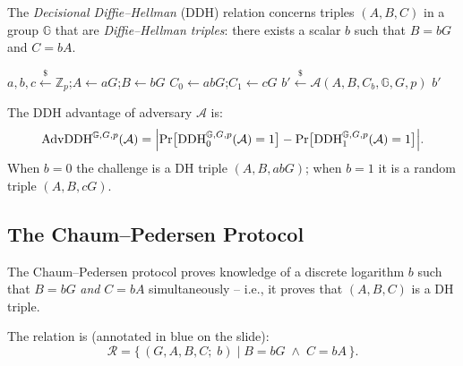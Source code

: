 \documentclass[11pt]{article}
\theoremstyle{plain}
\theoremstyle{definition}
\newcommand{\Zp}{\mathbb{Z}_p}
\newcommand{\getsr}{\xleftarrow{\$}}
\begin{document}
The \emph{Decisional Diffie--Hellman} (DDH) relation concerns triples $(A, B, C)$ in a group $\mathbb{G}$ that are \emph{Diffie--Hellman triples}: there exists a scalar $b$ such that $B = bG$ and $C = bA$.

\begin{tcolorbox}[colback=yellow!8!white, colframe=orange!80!black,
                  title={DDH Problem (game formulation)}]
\begin{algorithmic}[1]
    \State $a, b, c \getsr \Zp$;\quad $A \leftarrow aG$;\quad $B \leftarrow bG$
    \State $C_0 \leftarrow abG$;\quad $C_1 \leftarrow cG$
    \State $b' \getsr \mathcal{A}(A, B, C_b, \mathbb{G}, G, p)$
    \State \Return $b'$
  \EndProcedure
\end{algorithmic}
\medskip
The DDH advantage of adversary $\mathcal{A}$ is:
\[
  \mathrm{AdvDDH}^{\mathbb{G},G,p}(\mathcal{A})
  = \Bigl|\Pr\bigl[\mathrm{DDH}_0^{\mathbb{G},G,p}(\mathcal{A})=1\bigr]
    - \Pr\bigl[\mathrm{DDH}_1^{\mathbb{G},G,p}(\mathcal{A})=1\bigr]\Bigr|.
\]
When $b=0$ the challenge is a DH triple $(A,B,abG)$; when $b=1$ it is a random triple $(A,B,cG)$.
\end{tcolorbox}

\subsection{The Chaum--Pedersen Protocol}

The Chaum--Pedersen protocol proves knowledge of a discrete logarithm $b$ such that $B = bG$ \emph{and} $C = bA$ simultaneously -- i.e., it proves that $(A,B,C)$ is a DH triple.

\medskip
The relation is (annotated in blue on the slide):
\[
  \mathcal{R} = \bigl\{\,(G, A, B, C;\; b) \;\big|\; B = bG \;\wedge\; C = bA\,\bigr\}.
\]
\end{document}
